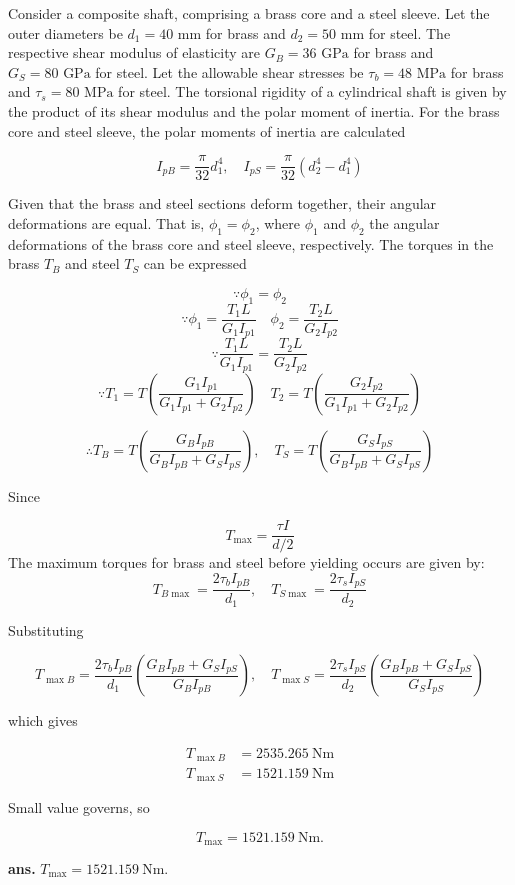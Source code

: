 \documentclass[12pt]{article}
\begin{document}
Consider a composite shaft, comprising a brass core and a steel sleeve. Let the outer diameters be \(d_1=40 \text{ mm}\) for brass and \(d_2=50 \text{ mm}\) for steel. The respective shear modulus of elasticity are \(G_B=36 \text{ GPa}\) for brass and \(G_S=80 \text{ GPa}\) for steel. Let the allowable shear stresses be \(\tau_b=48 \text{ MPa}\) for brass and \(\tau_s=80 \text{ MPa}\) for steel. The torsional rigidity of a cylindrical shaft is given by the product of its shear modulus and the polar moment of inertia. For the brass core and steel sleeve, the polar moments of inertia are calculated 

\[
I_{p B}=\frac{\pi}{32} d_1^4, \quad I_{p S}=\frac{\pi}{32}(d_2^4-d_1^4)
\]

Given that the brass and steel sections deform together, their angular deformations are equal. That is, \(\phi_1 = \phi_2\), where \(\phi_1\) and \(\phi_2\) the angular deformations of the brass core and steel sleeve, respectively. The torques in the brass \(T_B\) and steel \(T_S\) can be expressed

\[
\because \phi_1=\phi_2
\]
\[
\because\phi_1=\frac{T_1 L}{G_1 I_{p 1}} \quad \phi_2=\frac{T_2 L}{G_2 I_{p 2}}
\]
\[
\because\frac{T_1 L}{G_1 I_{p 1}}=\frac{T_2 L}{G_2 I_{p 2}}
\]
\[
\because T_1=T\left(\frac{G_1 I_{p 1}}{G_1 I_{p 1}+G_2 I_{p 2}}\right) \quad T_2=T\left(\frac{G_2 I_{p 2}}{G_1 I_{p 1}+G_2 I_{p 2}}\right)
\]

\[
\therefore T_B=T\left(\frac{G_B I_{p B}}{G_B I_{p B}+G_S I_{p S}}\right), \quad T_S=T\left(\frac{G_S I_{p S}}{G_B I_{p B}+G_S I_{p S}}\right)
\]

Since

\[T_{\text{max}}=\frac{\tau I}{d/2}\]
The maximum torques for brass and steel before yielding occurs are given by:
\[
T_{B \max}=\frac{2 \tau_b I_{p B}}{d_1}, \quad T_{S \max}=\frac{2 \tau_s I_{p S}}{d_2}
\]

Substituting

\[
T_{\max B} = \frac{2 \tau_b I_{p B}}{d_1}\left(\frac{G_B I_{p B}+G_S I_{p S}}{G_B I_{p B}}\right), \quad T_{\max S} = \frac{2 \tau_s I_{p S}}{d_2}\left(\frac{G_B I_{p B}+G_S I_{p S}}{G_S I_{p S}}\right)
\]

which gives

\[
\begin{aligned}
T_{\max B} & =2535.265 \mathrm{~N}\mathrm{m} \\
T_{\max S} & =1521.159 \mathrm{~N}\mathrm{m}
\end{aligned}
\]

Small value governs, so

\[
T_{\max }=1521.159 \mathrm{~N}\mathrm{m}.
\]
\AnswerTag


\vfill
\begin{flushright}
\textbf{ans.} \(T_{\max }=1521.159 \mathrm{~N}\mathrm{m}.\)
\end{flushright}
\end{document}
